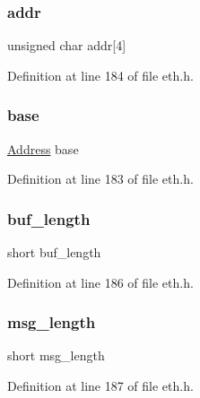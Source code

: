 \subsubsection{\texorpdfstring{addr}{addr}}
{\footnotesize\ttfamily unsigned char addr\mbox{[}4\mbox{]}}



Definition at line 184 of file eth.\+h.

\hypertarget{structeth__rx__head_ac2b0a066dca09bf3826dfaea2d1c5d02}{}\label{structeth__rx__head_ac2b0a066dca09bf3826dfaea2d1c5d02} 
\subsubsection{\texorpdfstring{base}{base}}
{\footnotesize\ttfamily \hyperlink{tap_8h_a40606a38de2ce007717541a358bab07b}{Address} base}



Definition at line 183 of file eth.\+h.

\hypertarget{structeth__rx__head_a92d29d8c4362c4b8a391fb5de16bcfd5}{}\label{structeth__rx__head_a92d29d8c4362c4b8a391fb5de16bcfd5} 
\subsubsection{\texorpdfstring{buf\+\_\+length}{buf\_length}}
{\footnotesize\ttfamily short buf\+\_\+length}



Definition at line 186 of file eth.\+h.

\hypertarget{structeth__rx__head_a65037217b1c4a0da94ac9d9552b1747e}{}\label{structeth__rx__head_a65037217b1c4a0da94ac9d9552b1747e} 
\subsubsection{\texorpdfstring{msg\+\_\+length}{msg\_length}}
{\footnotesize\ttfamily short msg\+\_\+length}



Definition at line 187 of file eth.\+h.


